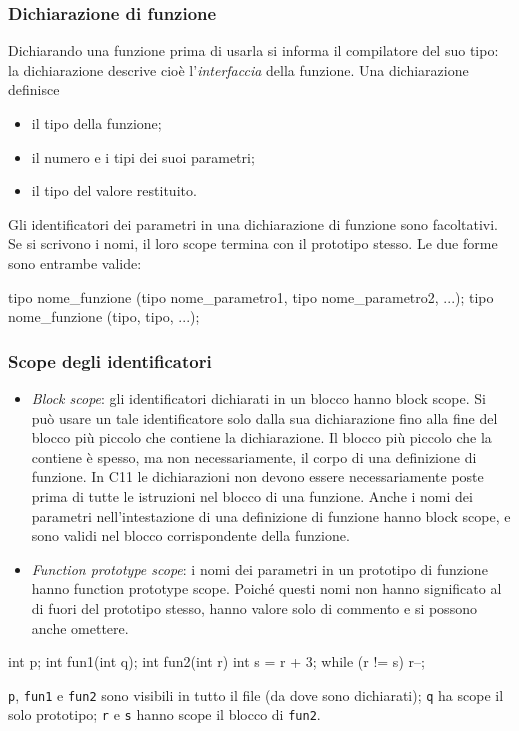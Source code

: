 \documentclass[11pt,a4paper]{article}
\begin{document}
\subsubsection{Dichiarazione di funzione}

Dichiarando una funzione prima di usarla si informa il compilatore del suo tipo: la dichiarazione descrive cioè l'\emph{interfaccia} della funzione. Una dichiarazione definisce
\begin{itemize}
    \item il tipo della funzione;
    \item il numero e i tipi dei suoi parametri;
    \item il tipo del valore restituito.
\end{itemize}
Gli identificatori dei parametri in una dichiarazione di funzione sono facoltativi. Se si scrivono i nomi, il loro scope termina con il prototipo stesso. Le due forme sono entrambe valide:
\begin{codice}
tipo nome_funzione (tipo nome_parametro1, tipo nome_parametro2, ...);
tipo nome_funzione (tipo, tipo, ...);
\end{codice}

\subsubsection{Scope degli identificatori}

\begin{itemize}
    \item \emph{Block scope}: gli identificatori dichiarati in un blocco hanno block scope. Si può usare un tale identificatore solo dalla sua dichiarazione fino alla fine del blocco più piccolo che contiene la dichiarazione. Il blocco più piccolo che la contiene è spesso, ma non necessariamente, il corpo di una definizione di funzione. In C11 le dichiarazioni non devono essere necessariamente poste prima di tutte le istruzioni nel blocco di una funzione. Anche i nomi dei parametri nell'intestazione di una definizione di funzione hanno block scope, e sono validi nel blocco corrispondente della funzione.
    \item \emph{Function prototype scope}: i nomi dei parametri in un prototipo di funzione hanno function prototype scope. Poiché questi nomi non hanno significato al di fuori del prototipo stesso, hanno valore solo di commento e si possono anche omettere.
\end{itemize}

\begin{esempio}
\begin{codice}
int p;
int fun1(int q);
int fun2(int r)
{
    int s = r + 3;
    while (r != s)
        r--;
}
\end{codice}
\lstinline|p|, \lstinline|fun1| e \lstinline|fun2| sono visibili in tutto il file (da dove sono dichiarati); \lstinline|q| ha scope il solo prototipo; \lstinline|r| e \lstinline|s| hanno scope il blocco di \lstinline|fun2|.
\end{esempio}
\end{document}
